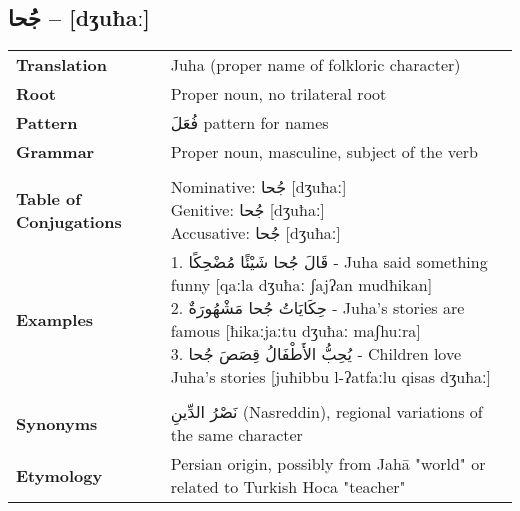 \documentclass[letter,12pt]{article}
\begin{document}
\subsection{\textarabic{جُحا} – [dʒuħaː]}
\begin{tabular}{p{3cm}p{10cm}}
\toprule
\textbf{Translation} & Juha (proper name of folkloric character) \\
\textbf{Root} & Proper noun, no trilateral root \\
\textbf{Pattern} & \textarabic{فُعَلَ} pattern for names \\
\textbf{Grammar} & Proper noun, masculine, subject of the verb \\
\midrule \\
\textbf{Table of Conjugations} & \makecell[l]{
Nominative: \textarabic{جُحا} [dʒuħaː] \\
Genitive: \textarabic{جُحا} [dʒuħaː] \\
Accusative: \textarabic{جُحا} [dʒuħaː]
} \\
\midrule
\textbf{Examples} & \makecell[l]{\parbox{9.5cm}{
1. \textarabic{قَالَ جُحا شَيْئًا مُضْحِكًا} - Juha said something funny [qaːla dʒuħaː ʃajʔan mudħikan]\\
2. \textarabic{حِكَايَاتُ جُحا مَشْهُورَةٌ} - Juha's stories are famous [ħikaːjaːtu dʒuħaː maʃhuːra]\\
3. \textarabic{يُحِبُّ الأَطْفَالُ قِصَصَ جُحا} - Children love Juha's stories [juħibbu l-ʔatfaːlu qisas dʒuħaː]
}} \\
\midrule \\
\textbf{Synonyms} & \textarabic{نَصْرُ الدِّينِ} (Nasreddin), regional variations of the same character \\
\textbf{Etymology} & Persian origin, possibly from Jahā "world" or related to Turkish Hoca "teacher" \\
\bottomrule
\end{tabular}
\end{document}
